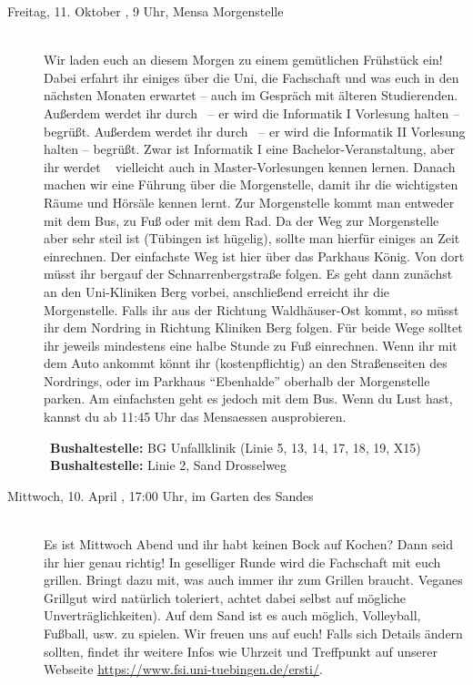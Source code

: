 \begin{description}
\else  
\item[Freitag, 11. Oktober \YEAR, 9 Uhr, Mensa Morgenstelle]\ \\
Wir laden euch an diesem Morgen zu einem gemütlichen Frühstück ein! Dabei erfahrt ihr einiges über die Uni, die Fachschaft und was euch in den nächsten Monaten erwartet -- auch im Gespräch mit älteren Studierenden. 
\ifwintersemester Außerdem werdet ihr durch \Infoprof~-- er wird die Informatik I Vorlesung halten -- begrüßt. \fi 
\ifsommersemester Außerdem werdet ihr durch \Infoprof~-- er wird die Informatik II Vorlesung halten -- begrüßt. \fi 
\ifmaster Zwar ist Informatik I eine Bachelor-Veranstaltung, aber ihr werdet \Infoprof~ vielleicht auch in Master-Vorlesungen kennen lernen. \fi
\ifwintersemester
Danach machen wir eine Führung über die Morgenstelle, damit ihr die wichtigsten Räume und Hörsäle kennen lernt.
Zur Morgenstelle kommt man entweder mit dem Bus, zu Fuß oder mit dem Rad. Da der Weg zur Morgenstelle aber sehr steil ist (Tübingen ist hügelig), sollte man hierfür einiges an Zeit einrechnen.
Der einfachste Weg ist hier über das Parkhaus König. Von dort müsst ihr bergauf der Schnarrenbergstraße folgen. Es geht dann zunächst an den Uni-Kliniken Berg vorbei, anschließend erreicht ihr die Morgenstelle. Falls ihr aus der Richtung Waldh\"auser-Ost kommt, so m\"usst ihr dem Nordring in Richtung Kliniken Berg folgen. Für beide Wege solltet ihr jeweils mindestens eine halbe Stunde zu Fuß einrechnen.
Wenn ihr mit dem Auto ankommt k\"onnt ihr (kostenpflichtig) an den Straßenseiten des Nordrings, oder im Parkhaus "`Ebenhalde"' oberhalb der Morgenstelle parken. Am einfachsten geht es jedoch mit dem Bus.
Wenn du Lust hast, kannst du ab 11:45 Uhr das Mensaessen ausprobieren.
\fi

\ifwintersemester {}~\textbf{Bushaltestelle:} BG Unfallklinik (Linie 5, 13, 14, 17, 18, 19, X15) \fi 
\ifsommersemester {}~\textbf{Bushaltestelle:} Linie 2, Sand Drosselweg \fi 
\fi 



\item[Mittwoch, 10. April \YEAR, 17:00 Uhr, im Garten des Sandes ]\ \\
Es ist Mittwoch Abend und ihr habt keinen Bock auf Kochen? Dann seid ihr hier genau richtig! In geselliger Runde wird die Fachschaft mit euch grillen. Bringt dazu mit, was auch immer ihr zum Grillen braucht. Veganes Grillgut wird natürlich toleriert, achtet dabei selbst auf mögliche Unverträglichkeiten). Auf dem Sand ist es auch möglich, Volleyball, Fußball, usw. zu spielen. Wir freuen uns auf euch!
Falls sich Details ändern sollten, findet ihr weitere Infos wie Uhrzeit und Treffpunkt auf unserer Webseite \url{https://www.fsi.uni-tuebingen.de/ersti/}.


\end{description}
